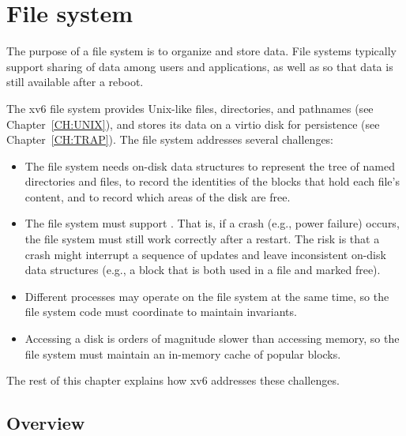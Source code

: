 \chapter{File system}
\label{CH:FS}
% 
% 
% 	
% 

The purpose of a file system is to organize and store data. File systems
typically support sharing of data among users and applications, as well as
so that data is still available after a reboot.

The xv6 file system provides Unix-like files, directories, and pathnames
(see Chapter~\ref{CH:UNIX}), and stores its data on a virtio disk for
persistence (see Chapter~\ref{CH:TRAP}). The file system addresses
several challenges:
\begin{itemize}
  
\item The file system needs on-disk data structures to represent the tree
of named directories and files, to record the identities of the
blocks that hold each file's content, and to record which areas
of the disk are free.
\item The file system must support
.
That is, if a crash (e.g., power failure) occurs, the file system must
still work correctly after a restart. The risk is that a crash might
interrupt a sequence of updates and leave inconsistent on-disk data
structures (e.g., a block that is both used in a file and marked free).
\item Different processes may operate on the file system at the same time,
so the file system code must coordinate to maintain invariants.
\item Accessing a disk is orders of magnitude slower than accessing
memory, so the file system must maintain an in-memory cache of
popular blocks.

\end{itemize}

The rest of this chapter explains how xv6 addresses these challenges.
\section{Overview}


